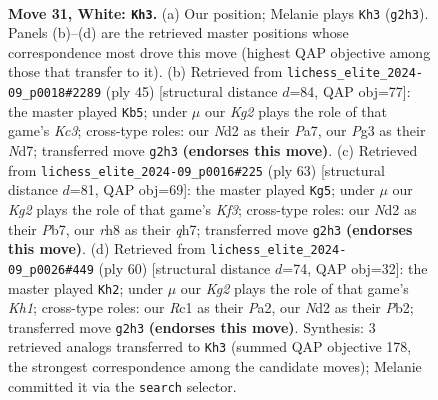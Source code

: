 \documentclass[11pt]{article}
\begin{document}
\clearpage

\begin{figure}[p]\centering
\begin{subfigure}{0.46\textwidth}\centering
\resizebox{\linewidth}{!}{%
\newchessgame
\chessboard[
  setfen={r3k2r/p3b1pp/8/n2p4/p2P3P/4P1P1/1BQNq1K1/2R5 w - - 4 31},
  showmover=false,
  pgfstyle=straightmove, color=movearrow, markmove={g2-h3}
]}
\caption{}
\end{subfigure}\hfill
\begin{subfigure}{0.46\textwidth}\centering
\resizebox{\linewidth}{!}{%
\newchessgame
\chessboard[
  setfen={Q7/p2n4/2k1p3/2p1P1Bp/q6P/2P5/3K1PP1/3R2NR b - - 0 23},
  showmover=false,
  pgfstyle=straightmove, color=movearrow, markmove={c6-b5}
]}
\caption{}
\end{subfigure}
\\[4pt]
\begin{subfigure}{0.46\textwidth}\centering
\resizebox{\linewidth}{!}{%
\newchessgame
\chessboard[
  setfen={2r2r2/1p1b3Q/p3pk1p/q2pn2N/8/P1P1PP2/8/1BR1KR2 b - - 3 32},
  showmover=false,
  pgfstyle=straightmove, color=movearrow, markmove={f6-g5}
]}
\caption{}
\end{subfigure}\hfill
\begin{subfigure}{0.46\textwidth}\centering
\resizebox{\linewidth}{!}{%
\newchessgame
\chessboard[
  setfen={2b1r2k/p3p2p/1p6/3PR2Q/2Pp4/7P/PP4P1/2q4K w - - 7 31},
  showmover=false,
  pgfstyle=straightmove, color=movearrow, markmove={h1-h2}
]}
\caption{}
\end{subfigure}
\caption{\textbf{Move 31, White: \texttt{Kh3}.} (a) Our position; Melanie plays \texttt{Kh3} (\texttt{g2h3}). Panels (b)--(d) are the retrieved master positions whose correspondence most drove this move (highest QAP objective among those that transfer to it). (b) Retrieved from \texttt{lichess\_elite\_2024-09\_p0018\#2289} (ply 45) [structural distance $d$=84, QAP obj=77]: the master played \texttt{Kb5}; under $\mu$ our \emph{Kg2} plays the role of that game's \emph{Kc3}; cross-type roles: our \emph{N}d2 as their \emph{P}a7, our \emph{P}g3 as their \emph{N}d7; transferred move \texttt{g2h3} \textbf{(endorses this move)}. (c) Retrieved from \texttt{lichess\_elite\_2024-09\_p0016\#225} (ply 63) [structural distance $d$=81, QAP obj=69]: the master played \texttt{Kg5}; under $\mu$ our \emph{Kg2} plays the role of that game's \emph{Kf3}; cross-type roles: our \emph{N}d2 as their \emph{P}b7, our \emph{r}h8 as their \emph{q}h7; transferred move \texttt{g2h3} \textbf{(endorses this move)}. (d) Retrieved from \texttt{lichess\_elite\_2024-09\_p0026\#449} (ply 60) [structural distance $d$=74, QAP obj=32]: the master played \texttt{Kh2}; under $\mu$ our \emph{Kg2} plays the role of that game's \emph{Kh1}; cross-type roles: our \emph{R}c1 as their \emph{P}a2, our \emph{N}d2 as their \emph{P}b2; transferred move \texttt{g2h3} \textbf{(endorses this move)}. Synthesis: 3 retrieved analogs transferred to \texttt{Kh3} (summed QAP objective 178, the strongest correspondence among the candidate moves); Melanie committed it via the \texttt{search} selector.}
\label{fig:thought-m60}
\end{figure}
\end{document}
